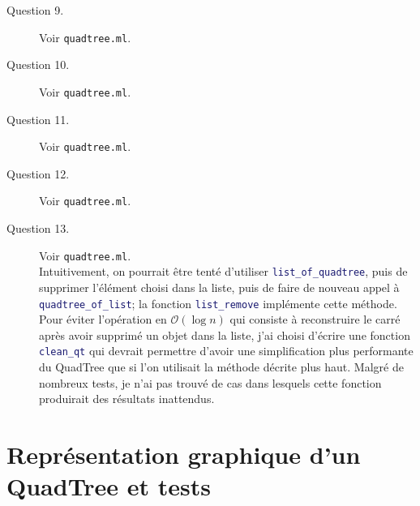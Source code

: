 \documentclass[11pt]{scrartcl}
\newcommand{\functionname}[1]{\texttt{\textcolor{MidnightBlue}{#1}}}
\newcommand{\filename}[1]{\texttt{\textcolor{RawSienna}{#1}}}
\begin{document}
\begin{description}
\item[Question 9.] Voir \filename{quadtree.ml}.

\item[Question 10.] Voir \filename{quadtree.ml}.

\item[Question 11.] Voir \filename{quadtree.ml}.

\item[Question 12.] Voir \filename{quadtree.ml}.

\item[Question 13.] Voir \filename{quadtree.ml}.\\
Intuitivement, on pourrait être tenté d'utiliser \functionname{list_of_quadtree}, puis de supprimer l'élément choisi dans la liste, puis de faire de nouveau appel à \functionname{quadtree_of_list}; la fonction \functionname{list_remove} implémente cette méthode.\\
Pour éviter l'opération en $\mathcal{O}(\log{}n)$ qui consiste à reconstruire le carré après avoir supprimé un objet dans la liste, j'ai choisi d'écrire une fonction \functionname{clean_qt} qui devrait permettre d'avoir une simplification plus performante du QuadTree que si l'on utilisait la méthode décrite plus haut. Malgré de nombreux tests, je n'ai pas trouvé de cas dans lesquels cette fonction produirait des résultats inattendus.
\end{description}

\section{Représentation graphique d'un QuadTree et tests}
\end{document}

